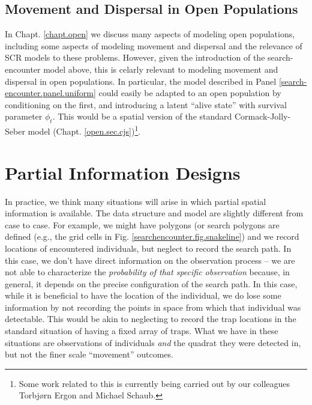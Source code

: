 \subsection{Movement and Dispersal in Open Populations}

In Chapt. \ref{chapt.open} we discuss many aspects of modeling open
populations, including some aspects of modeling movement and dispersal
and the relevance of SCR models to these problems. However, given the
introduction of the search-encounter model above, this is celarly
relevant to modeling movement and dispersal in open populations.  In
particular, the model described in Panel
\ref{search-encounter.panel.uniform} could easily be adapted to an
open population by conditioning on the first, and introducing a latent
``alive state'' with survival parameter $\phi_{t}$. This would be a
spatial version of the standard Cormack-Jolly-Seber model
(Chapt. \ref{open.sec.cjs})\footnote{Some work related to this is
  currently being carried out by our colleagues Torbj{\o}rn Ergon and
  Michael Schaub.}.


\section{Partial Information Designs}



In practice, we think many situations will arise in which partial
spatial information is available. The data structure and model are 
slightly different from case to case. 
For example, 
we might have polygons (or search polygons are defined (e.g., the
grid cells in Fig. \ref{searchencounter.fig.snakeline}) and we record
locations of encountered individuals, but neglect to record the search
path.  In this case, we don't have direct information on the
observation process -- we are not able to characterize the {\it
  probability of that specific observation} because, in general, it
depends on the precise configuration of the search path.  In this
case, while it is beneficial to have the location of the individual,
we do lose some information by not recording the points in space from
which that individual was detectable. This would be akin to neglecting
to record the trap locations in the standard situation of having a
fixed array of traps.
What we have in these situations are observations of individuals {\it
  and} the quadrat they were detected in, but not the finer scale
``movement'' outcomes.

